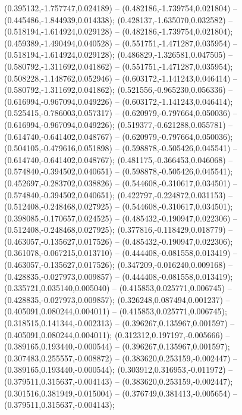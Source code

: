  (0.395132,-1.757747,0.024189) -- (0.482186,-1.739754,0.021804) -- (0.445486,-1.844939,0.014338);
 (0.428137,-1.635070,0.032582) -- (0.518194,-1.614924,0.029128) -- (0.482186,-1.739754,0.021804);
 (0.459389,-1.490494,0.040528) -- (0.551751,-1.471287,0.035954) -- (0.518194,-1.614924,0.029128);
 (0.486829,-1.326581,0.047505) -- (0.580792,-1.311692,0.041862) -- (0.551751,-1.471287,0.035954);
 (0.508228,-1.148762,0.052946) -- (0.603172,-1.141243,0.046414) -- (0.580792,-1.311692,0.041862);
 (0.521556,-0.965230,0.056336) -- (0.616994,-0.967094,0.049226) -- (0.603172,-1.141243,0.046414);
 (0.525415,-0.786003,0.057317) -- (0.620979,-0.797664,0.050036) -- (0.616994,-0.967094,0.049226);
 (0.519377,-0.621288,0.055781) -- (0.614740,-0.641402,0.048767) -- (0.620979,-0.797664,0.050036);
 (0.504105,-0.479616,0.051898) -- (0.598878,-0.505426,0.045541) -- (0.614740,-0.641402,0.048767);
 (0.481175,-0.366453,0.046068) -- (0.574840,-0.394502,0.040651) -- (0.598878,-0.505426,0.045541);
 (0.452697,-0.283702,0.038826) -- (0.544608,-0.310617,0.034501) -- (0.574840,-0.394502,0.040651);
 (0.422797,-0.224872,0.031153) -- (0.512408,-0.248468,0.027925) -- (0.544608,-0.310617,0.034501);
 (0.398085,-0.170657,0.024525) -- (0.485432,-0.190947,0.022306) -- (0.512408,-0.248468,0.027925);
 (0.377816,-0.118429,0.018779) -- (0.463057,-0.135627,0.017526) -- (0.485432,-0.190947,0.022306);
 (0.361078,-0.067215,0.013710) -- (0.444408,-0.081558,0.013419) -- (0.463057,-0.135627,0.017526);
 (0.347209,-0.016240,0.009168) -- (0.428835,-0.027973,0.009857) -- (0.444408,-0.081558,0.013419);
 (0.335721,0.035140,0.005040) -- (0.415853,0.025771,0.006745) -- (0.428835,-0.027973,0.009857);
 (0.326248,0.087494,0.001237) -- (0.405091,0.080244,0.004011) -- (0.415853,0.025771,0.006745);
 (0.318515,0.141344,-0.002313) -- (0.396267,0.135967,0.001597) -- (0.405091,0.080244,0.004011);
 (0.312312,0.197197,-0.005666) -- (0.389165,0.193440,-0.000544) -- (0.396267,0.135967,0.001597);
 (0.307483,0.255557,-0.008872) -- (0.383620,0.253159,-0.002447) -- (0.389165,0.193440,-0.000544);
 (0.303912,0.316953,-0.011972) -- (0.379511,0.315637,-0.004143) -- (0.383620,0.253159,-0.002447);
 (0.301516,0.381949,-0.015004) -- (0.376749,0.381413,-0.005654) -- (0.379511,0.315637,-0.004143);
